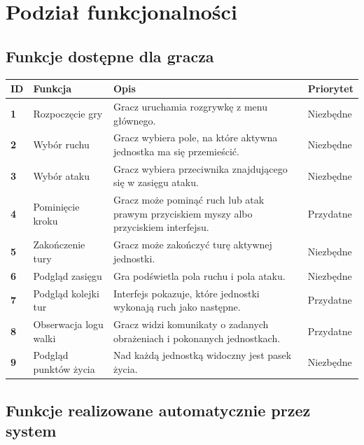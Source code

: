 \documentclass[12pt,a4paper]{article}
\begin{document}
\newpage

\section{Podział funkcjonalności}

\subsection{Funkcje dostępne dla gracza}

\begin{longtable}{>{\bfseries}p{1cm} p{4cm} p{8cm} p{2cm}}
\toprule
ID & Funkcja & Opis & Priorytet \\
\midrule
\endhead
1 & Rozpoczęcie gry & Gracz uruchamia rozgrywkę z menu głównego. & Niezbędne \\[4pt]
2 & Wybór ruchu & Gracz wybiera pole, na które aktywna jednostka ma się przemieścić. & Niezbędne \\[4pt]
3 & Wybór ataku & Gracz wybiera przeciwnika znajdującego się w zasięgu ataku. & Niezbędne \\[4pt]
4 & Pominięcie kroku & Gracz może pominąć ruch lub atak prawym przyciskiem myszy albo przyciskiem interfejsu. & Przydatne \\[4pt]
5 & Zakończenie tury & Gracz może zakończyć turę aktywnej jednostki. & Niezbędne \\[4pt]
6 & Podgląd zasięgu & Gra podświetla pola ruchu i pola ataku. & Niezbędne \\[4pt]
7 & Podgląd kolejki tur & Interfejs pokazuje, które jednostki wykonają ruch jako następne. & Przydatne \\[4pt]
8 & Obserwacja logu walki & Gracz widzi komunikaty o zadanych obrażeniach i pokonanych jednostkach. & Przydatne \\[4pt]
9 & Podgląd punktów życia & Nad każdą jednostką widoczny jest pasek życia. & Niezbędne \\
\bottomrule
\end{longtable}

\subsection{Funkcje realizowane automatycznie przez system}
\end{document}
